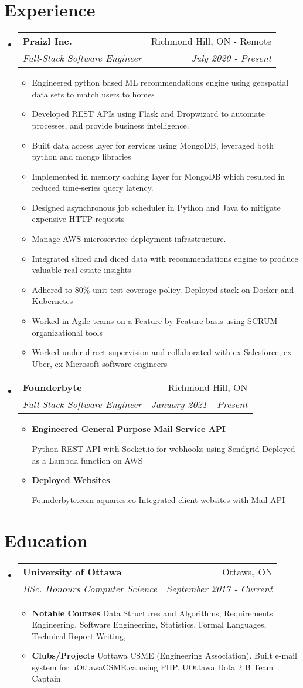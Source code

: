 \documentclass[letterpaper,11pt]{article}
\makeatletter
\newcommand{\resumeItem}[2]{
  \item\small{
    \textbf{#1}{#2 \vspace{-2pt}}
  }
}
\newcommand{\resumeSubheading}[4]{
  \vspace{-1pt}\item
    \begin{tabular*}{0.97\textwidth}[t]{l@{\extracolsep{\fill}}r}
      \textbf{#1} & #2 \\
      \textit{\small#3} & \textit{\small #4} \\
    \end{tabular*}\vspace{-5pt}
}
\newcommand{\resumeSubHeadingListStart}{\begin{itemize}[leftmargin=*]}
\newcommand{\resumeSubHeadingListEnd}{\end{itemize}}
\newcommand{\resumeItemListStart}{\begin{itemize}}
\newcommand{\resumeItemListEnd}{\end{itemize}\vspace{-5pt}}
\makeatother
\begin{document}
\section{Experience}
  \resumeSubHeadingListStart
	\resumeSubheading
	{Praizl Inc.}{Richmond Hill, ON - Remote}
	{Full-Stack Software Engineer}{July 2020 - Present}
		\resumeItemListStart
			\resumeItem{}
			{Engineered python based ML recommendations engine using geospatial data sets to match users to homes}
			\resumeItem{}
			{Developed  REST APIs using Flask and Dropwizard to automate processes, and provide business intelligence.}
			\resumeItem{}
			{Built data access layer for services using MongoDB, leveraged both python and mongo libraries}
			\resumeItem{}
			{Implemented in memory caching layer for MongoDB which resulted in reduced time-series query latency.}
			\resumeItem{}
			{Designed asynchronous job scheduler in Python and Java to mitigate expensive HTTP requests}
			\resumeItem{}
			{Manage AWS microservice deployment infrastructure. }
			\resumeItem{}
			{Integrated sliced and diced data with recommendations engine to produce valuable real estate insights}
			\resumeItem{}
			{Adhered to 80\% unit test coverage policy. Deployed stack on Docker and Kubernetes}
			\resumeItem{}
			{Worked in Agile teams on a Feature-by-Feature basis using SCRUM organizational tools }
			\resumeItem{}
			{Worked under direct supervision and collaborated with ex-Salesforce, ex-Uber, ex-Microsoft software engineers }
		\resumeItemListEnd
	    \resumeSubheading
	      {Founderbyte}{Richmond Hill, ON}
	      {Full-Stack Software Engineer}{January 2021 - Present}
	      \resumeItemListStart
		  \resumeItem{Engineered General Purpose Mail Service API}\newline
	          {Python REST API with Socket.io for webhooks using Sendgrid
			  Deployed as a Lambda function on AWS}
	        \resumeItem{Deployed Websites} \newline
	          {Founderbyte.com aquaries.co
                Integrated client websites with Mail API}
  
\resumeItemListEnd

\resumeSubHeadingListEnd

\section{Education}
  \resumeSubHeadingListStart
    \resumeSubheading
      {University of Ottawa}{Ottawa, ON}
      {BSc. Honours Computer Science}{September 2017 - Current}
	\resumeItemListStart
		\resumeItem{Notable Courses }
		{Data Structures and Algorithms, Requirements Engineering, Software Engineering, Statistics, Formal Languages, Technical Report Writing, }
	\resumeItem{Clubs/Projects }
		{Uottawa CSME (Engineering Association). Built e-mail system for uOttawaCSME.ca using PHP. UOttawa Dota 2 B Team Captain}	
	\resumeItemListEnd
  \resumeSubHeadingListEnd
\end{document}
